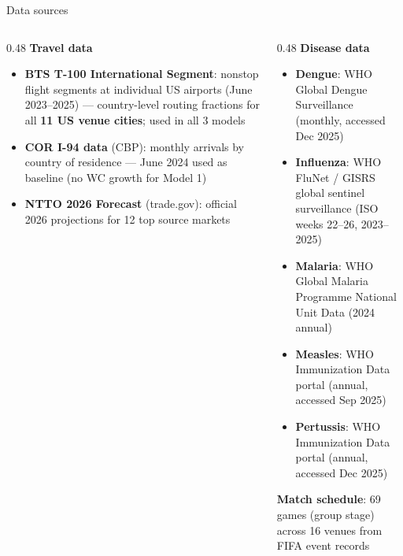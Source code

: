 \documentclass[aspectratio=169, 11pt]{beamer}
\begin{document}
\begin{frame}{Data sources}
  \begin{columns}[T]
    \begin{column}{0.48\textwidth}
      \textbf{Travel data}
      \begin{itemize}
        \item \textbf{BTS T-100 International Segment}: nonstop
              flight segments at individual US airports (June
              2023--2025) — country-level routing fractions for all
              \textbf{11 US venue cities}; used in all 3 models
        \item \textbf{COR I-94 data} (CBP): monthly arrivals by
              country of residence — June 2024 used as baseline
              (no WC growth for Model 1)
        \item \textbf{NTTO 2026 Forecast} (trade.gov): official
              2026 projections for 12 top source markets
      \end{itemize}
    \end{column}
    \begin{column}{0.48\textwidth}
      \textbf{Disease data}
      \begin{itemize}
        \item \textbf{Dengue}: WHO Global Dengue Surveillance
              (monthly, accessed Dec 2025)
        \item \textbf{Influenza}: WHO FluNet / GISRS global sentinel
              surveillance (ISO weeks 22--26, 2023--2025)
        \item \textbf{Malaria}: WHO Global Malaria Programme
              National Unit Data (2024 annual)
        \item \textbf{Measles}: WHO Immunization Data portal
              (annual, accessed Sep 2025)
        \item \textbf{Pertussis}: WHO Immunization Data portal
              (annual, accessed Dec 2025)
      \end{itemize}
      \vspace{0.5em}
      \textbf{Match schedule}: 69 games (group stage) across
      16 venues from FIFA event records
    \end{column}
  \end{columns}
\end{frame}
\end{document}
